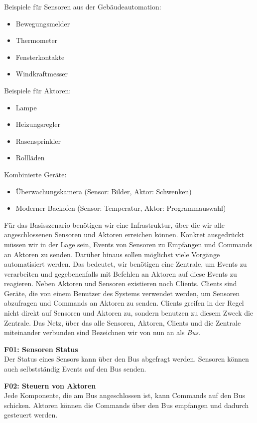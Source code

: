 Beispiele für Sensoren aus der Gebäudeautomation:

\begin{itemize}
	\item Bewegungsmelder
	\item Thermometer
	\item Fensterkontakte
	\item Windkraftmesser
\end{itemize}

Beispiele für Aktoren:

\begin{itemize}
	\item Lampe
	\item Heizungsregler
	\item Rasensprinkler
	\item Rollläden
\end{itemize}

Kombinierte Geräte:
\begin{itemize}
	\item Überwachungskamera (Sensor: Bilder, Aktor: Schwenken)
	\item Moderner Backofen (Sensor: Temperatur, Aktor: Programmauswahl)
\end{itemize}

Für das Basisszenario benötigen wir eine Infrastruktur, über die wir alle angeschlossenen Sensoren und Aktoren erreichen können. Konkret ausgedrückt müssen wir in der Lage sein, Events von Sensoren zu Empfangen und Commands an Aktoren zu senden. Darüber hinaus sollen möglichst viele Vorgänge automatisiert werden. Das bedeutet, wir benötigen eine Zentrale, um Events zu verarbeiten und gegebenenfalls mit Befehlen an Aktoren auf diese Events zu reagieren. Neben Aktoren und Sensoren existieren noch Clients. Clients sind Geräte, die von einem Benutzer des Systems verwendet werden, um Sensoren abzufragen und Commands an Aktoren zu senden. Clients greifen in der Regel nicht direkt auf Sensoren und Aktoren zu, sondern benutzen zu diesem Zweck die Zentrale. Das Netz, über das alle Sensoren, Aktoren, Clients und die Zentrale miteinander verbunden sind Bezeichnen wir von nun an als \textit{Bus}.

\textbf{F01: Sensoren Status} \\
Der Status eines Sensors kann über den Bus abgefragt werden. Sensoren können auch selbstständig Events auf den Bus senden.

\textbf{F02: Steuern von Aktoren} \\
Jede Komponente, die am Bus angeschlossen ist, kann Commands auf den Bus schicken. Aktoren können die Commands über den Bus empfangen und dadurch gesteuert werden. 

